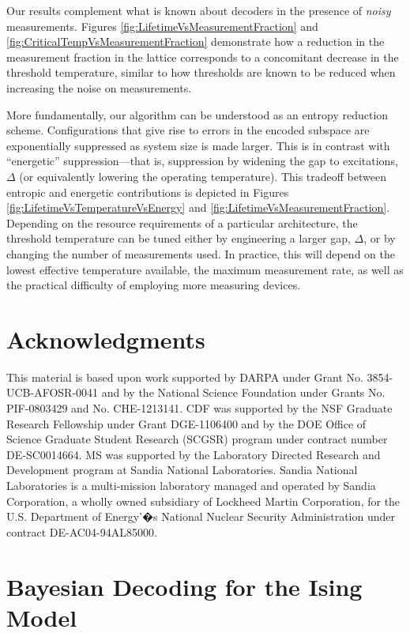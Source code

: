 \documentclass[twocolumn,superscriptaddress,aps,prb,floatfix]{revtex4-1}
\begin{document}
Our results complement what is known about decoders in the presence of \emph{noisy} measurements.  Figures \ref{fig:LifetimeVsMeasurementFraction} and \ref{fig:CriticalTempVsMeasurementFraction} demonstrate how a reduction in the measurement fraction in the lattice corresponds to a concomitant decrease in the threshold temperature, similar to how thresholds are known to be reduced when increasing the noise on measurements.

More fundamentally, our algorithm can be understood as an entropy reduction scheme.  Configurations that give rise to errors in the encoded subspace are exponentially suppressed as system size is made larger.  This is in contrast with ``energetic'' suppression---that is, suppression by widening the gap to excitations, $\Delta$ (or equivalently lowering the operating temperature).  This tradeoff between entropic and energetic contributions is depicted in Figures \ref{fig:LifetimeVsTemperatureVsEnergy} and \ref{fig:LifetimeVsMeasurementFraction}.  Depending on the resource requirements of a particular architecture, the threshold temperature can be tuned either by engineering a larger gap, $\Delta$, or by changing the number of measurements used.  In practice, this will depend on the lowest effective temperature available, the maximum measurement rate, as well as the practical difficulty of employing more measuring devices.



\section{Acknowledgments}
This material is based upon work supported by DARPA under Grant No. 3854-UCB-AFOSR-0041 and by the National Science Foundation under Grants No. PIF-0803429 and No. CHE-1213141.  CDF was supported by the NSF Graduate Research Fellowship under Grant DGE-1106400 and by the DOE Office of Science Graduate Student Research (SCGSR) program under contract number DE‐SC0014664. MS was supported by the Laboratory Directed Research and Development program at Sandia National Laboratories.  Sandia National Laboratories is a multi-mission laboratory managed and operated by Sandia Corporation, a wholly owned subsidiary of Lockheed Martin Corporation, for the U.S. Department of Energy'�s National Nuclear Security Administration under contract DE-AC04-94AL85000. 



\appendix
\section{Bayesian Decoding for the Ising Model}
\label{sec:bayesdecoder}
\end{document}
